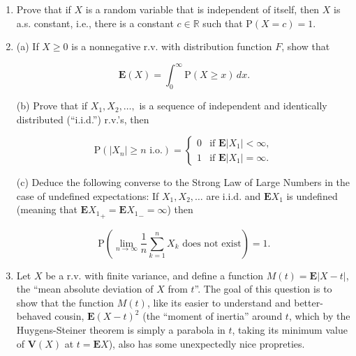 \documentclass[11pt]{report}
\newcommand{\R}{\mathbb{R}}
\theoremstyle{plain}
\theoremstyle{definition}
\begin{document}
\begin{enumerate}[label=\arabic*.]
(c) Use the same ``discrete convolution'' formula to prove directly that if $X \sim \operatorname{Bin}(n,p)$ and $Y\sim \operatorname{Bin}(m,p)$ are independent then $X+Y \sim \operatorname{Bin}(n+m,p)$. You may make use of the combinatorial identity (known as the Vandermonde identity or Chu-Vandermonde identity)

\[
\sum_{j=0}^k \binom{n}{j} \binom{m}{k-j} = \binom{n+m}{k}, \qquad (n,m\ge 0,\ 0\le k\le n+m).
\]

As a bonus, try to find a direct combinatorial proof for this identity. An amusing version of the answer can be found at \href{http://en.wikipedia.org/wiki/Vandermonde's_identity}{the Wikipedia article on Vandermonde's identity}.
\item Prove that if $X$ is a random variable that is independent of itself, then $X$ is a.s. constant, i.e., there is a constant $c\in\R$ such that $\mathrm{P}(X=c)=1$.
\item (a) If $X\ge 0$ is a nonnegative r.v. with distribution function $F$, show that

\[
\mathbf{E}(X)=\int_0^\infty \mathrm{P}(X\ge x)\,dx.
\]

(b) Prove that if $X_1, X_2, \ldots,$ is a sequence of independent and identically distributed (``i.i.d.'') r.v.'s, then

\[
\mathrm{P}(|X_n|\ge n\textrm{ i.o.})=\begin{cases} 0 & \textrm{if }\mathbf{E}|X_1|<\infty, \\
1 & \textrm{if }\mathbf{E}|X_1|=\infty. \end{cases}
\]

(c) Deduce the following converse to the Strong Law of Large Numbers in the case of undefined expectations:
If $X_1,X_2,\ldots$ are i.i.d. and $\mathbf{E} X_1$ is undefined (meaning that $\mathbf{E} {X_1}_+ = \mathbf{E} {X_1}_- = \infty$) then

\[
\mathrm{P}\left( \lim_{n\to\infty} \frac{1}{n}\sum_{k=1}^n X_k\textrm{ does not exist} \right) = 1.
\]
\item Let $X$ be a r.v. with finite variance, and define a function $M(t)=\mathbf{E}|X-t|$, the ``mean absolute deviation of $X$ from $t$''. The goal of this question is to show that the function $M(t)$, like its easier to understand and better-behaved cousin, $\mathbf{E}(X-t)^2$ (the ``moment of inertia'' around $t$, which by the Huygens-Steiner theorem is simply a parabola in $t$, taking its minimum value of $\mathbf{V}(X)$ at $t=\mathbf{E} X$), also has some unexpectedly nice propreties.


\end{enumerate}
\end{document}
